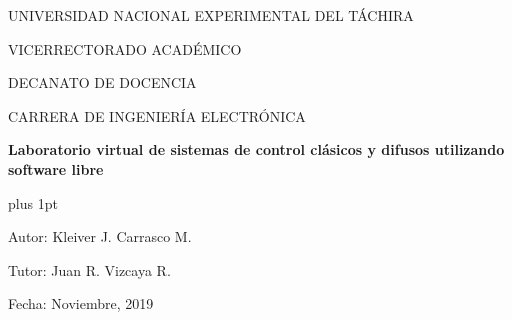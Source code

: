 \begin{center}
	\begin{spacing}{1}
		UNIVERSIDAD NACIONAL EXPERIMENTAL DEL TÁCHIRA
		
		VICERRECTORADO ACADÉMICO
		
		DECANATO DE DOCENCIA
		
		CARRERA DE INGENIERÍA ELECTRÓNICA
	
		\vspace{30pt}

		{\large \textbf{Laboratorio virtual de sistemas de control clásicos y difusos utilizando software libre}\par}
	
	\end{spacing}
\end{center}

\vspace{20pt}

\begin{flushright}
	\begin{spacing}{1}
		\parskip=0pt plus 1pt

		Autor: Kleiver J. Carrasco M.

		Tutor: Juan R. Vizcaya R.

		Fecha: Noviembre, 2019
		
	\end{spacing}	
\end{flushright}

\vspace{10pt}

\begin{abstract}
	\blindtext
\end{abstract}

